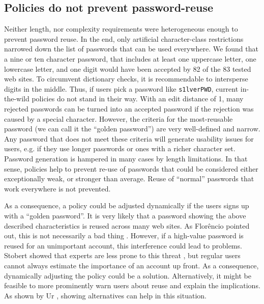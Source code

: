 \subsection{Policies do not prevent password-reuse}
Neither length, nor complexity requirements were heterogeneous enough to prevent password reuse. In the end, only artificial character-class restrictions narrowed down the list of passwords that can be used everywhere. We found that a nine or ten character password, that includes at least one uppercase letter, one lowercase letter, and one digit would have been accepted by 82 of the 83 tested web sites. To circumvent dictionary checks, it is recommendable to intersperse digits in the middle. Thus, if users pick a password like \texttt{s1lverPWD}, current in-the-wild policies do not stand in their way. With an edit distance of 1, many rejected passwords can be turned into an accepted password if the rejection was caused by a special character. However, the criteria for the most-reusable password (we can call it the ``golden password'') are very well-defined and narrow. Any password that does not meet these criteria will generate usability issues for users, e.g. if they use longer passwords or ones with a richer character set. Password generation is hampered in many cases by length limitations. In that sense, policies help to prevent re-use of passwords that could be considered either exceptionally weak, or stronger than average. Reuse of ``normal'' passwords that work everywhere is not prevented.


As a consequence, a policy could be adjusted dynamically if the users signs up with a ``golden password''. It is very likely that a password showing the above described characteristics is reused across many web sites. As Florêncio \etal pointed out, this is not necessarily a bad thing \cite{Florencio2014PasswordPortfoliosFiniteUser}. However, if a high-value password is reused for an unimportant account, this interference could lead to problems. Stobert showed that experts are less prone to this threat \cite{Stobert2015ExpertPassword}, but regular users cannot always estimate the importance of an account up front. As a consequence, dynamically adjusting the policy could be a solution. Alternatively, it might be feasible to more prominently warn users about reuse and explain the implications. As shown by Ur \etal, showing alternatives can help in this situation. 

